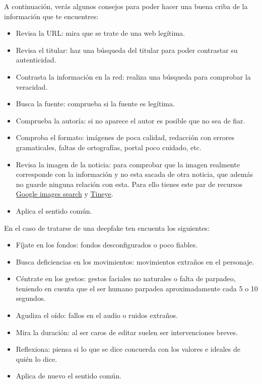 \documentclass[
  spanish,
  a4paper,
  openany]{book}
\begin{document}
A continuación, verás algunos consejos para poder hacer una buena criba de la información que te encuentres:

\begin{itemize}
\item
  Revisa la URL: mira que se trate de una web legítima.
\item
  Revisa el titular: haz una búsqueda del titular para poder contrastar su autenticidad.
\item
  Contrasta la información en la red: realiza una búsqueda para comprobar la veracidad.
\item
  Busca la fuente: comprueba si la fuente es legítima.
\item
  Comprueba la autoría: si no aparece el autor es posible que no sea de fiar.
\item
  Comproba el formato: imágenes de poca calidad, redacción con errores gramaticales, faltas de ortografías, portal poco cuidado, etc.
\item
  Revisa la imagen de la noticia: para comprobar que la imagen realmente corresponde con la información y no esta sacada de otra noticia, que además no guarde ninguna relación con esta. Para ello tienes este par de recursos \href{https://www.google.es/imghp?hl=es}{Google images search} y \href{https://tineye.com/}{Tineye}.
\item
  Aplica el sentido común.
\end{itemize}

En el caso de tratarse de una deepfake ten encuenta los siguientes:

\begin{itemize}
\item
  Fíjate en los fondos: fondos desconfigurados o poco fiables.
\item
  Busca deficiencias en los movimientos: movimientos extraños en el personaje.
\item
  Céntrate en los gestos: gestos faciales no naturales o falta de parpadeo, teniendo en cuenta que el ser humano parpadea aproximadamente cada 5 o 10 segundos.
\item
  Agudiza el oído: fallos en el audio o ruidos extraños.
\item
  Mira la duración: al ser caros de editar suelen ser intervenciones breves.
\item
  Reflexiona: piensa si lo que se dice concuerda con los valores e ideales de quién lo dice.
\item
  Aplica de nuevo el sentido común.
\end{itemize}
\end{document}
